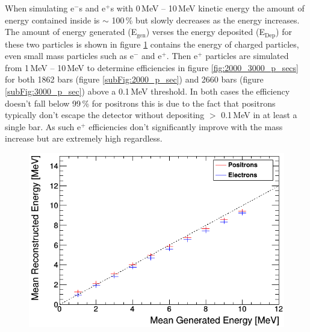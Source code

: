 When simulating e$^-$s and e$^+$s with 0\,MeV -- 10\,MeV kinetic energy the amount of energy contained inside is $\sim$ 100\,\% but slowly decreases as the energy increases. The amount of energy generated (E$_\textrm{{gen}}$) verses the energy deposited  (E$_\textrm{{Dep}}$) for these two particles is shown in figure \ref{fig:recon_gen_ele_pos} contains the energy of charged particles, even small mass particles such as e$^-$ and e$^+$. Then e$^+$ particles are simulated from 1\,MeV -- 10\,MeV to determine efficiencies in figure \ref{fig:2000_3000_p_secs} for both 1862 bars (figure \ref{subFig:2000_p_sec}) and 2660 bars (figure \ref{subFig:3000_p_sec}) above a 0.1\,MeV threshold. In both cases the efficiency doesn't fall below 99\,\% for positrons this is due to the fact that positrons typically don't escape the detector without depositing $>$ 0.1\,MeV in at least a single bar. As such e$^+$ efficiencies don't significantly improve with the mass increase but are extremely high regardless.  

\begin{figure}[htbp]
 \centering
 \includegraphics[width=0.7\linewidth]{Chapter4/Figs/Raster/year1Plots/Recon_vs_gen_e-_e+.png}
 \label{fig:recon_gen_ele_pos}
\end{figure} 

